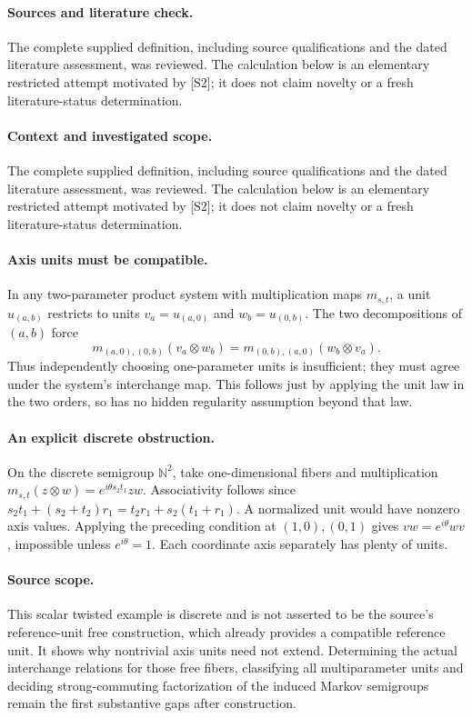 \documentclass[11pt]{article}
\begin{document}
\paragraph{Sources and literature check.}
The complete supplied definition, including source qualifications and the dated literature assessment, was reviewed. The calculation below is an elementary restricted attempt motivated by [S2]; it does not claim novelty or a fresh literature-status determination.

\paragraph{Context and investigated scope.} The complete supplied definition, including source qualifications and the dated literature assessment, was reviewed. The calculation below is an elementary restricted attempt motivated by [S2]; it does not claim novelty or a fresh literature-status determination.

\paragraph{Axis units must be compatible.} In any two-parameter product system with multiplication maps $m_{s,t}$, a unit $u_{(a,b)}$ restricts to units $v_a=u_{(a,0)}$ and $w_b=u_{(0,b)}$. The two decompositions of $(a,b)$ force
\[
 m_{(a,0),(0,b)}(v_a\otimes w_b)
 =m_{(0,b),(a,0)}(w_b\otimes v_a).
\]
Thus independently choosing one-parameter units is insufficient; they must agree under the system's interchange map. This follows just by applying the unit law in the two orders, so has no hidden regularity assumption beyond that law.

\paragraph{An explicit discrete obstruction.} On the discrete semigroup $\mathbb N^2$, take one-dimensional fibers and multiplication $m_{s,t}(z\otimes w)=e^{i\theta s_2t_1}zw$. Associativity follows since $s_2t_1+(s_2+t_2)r_1=t_2r_1+s_2(t_1+r_1)$. A normalized unit would have nonzero axis values. Applying the preceding condition at $(1,0),(0,1)$ gives $vw=e^{i\theta}wv$, impossible unless $e^{i\theta}=1$. Each coordinate axis separately has plenty of units.

\paragraph{Source scope.} This scalar twisted example is discrete and is not asserted to be the source's reference-unit free construction, which already provides a compatible reference unit. It shows why nontrivial axis units need not extend. Determining the actual interchange relations for those free fibers, classifying all multiparameter units and deciding strong-commuting factorization of the induced Markov semigroups remain the first substantive gaps after construction.
\end{document}

